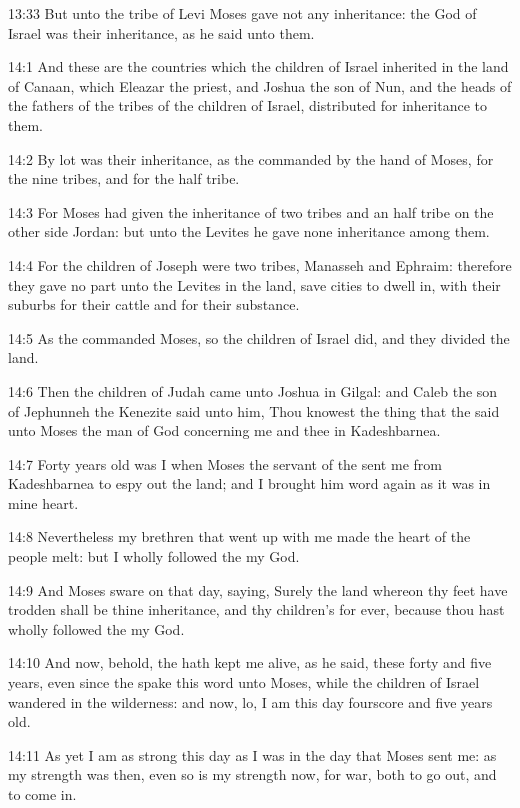 13:33 But unto the tribe of Levi Moses gave not any inheritance: the \LORD God of Israel was their inheritance, as he said unto them.

14:1 And these are the countries which the children of Israel inherited in the land of Canaan, which Eleazar the priest, and Joshua the son of Nun, and the heads of the fathers of the tribes of the children of Israel, distributed for inheritance to them.

14:2 By lot was their inheritance, as the \LORD commanded by the hand of Moses, for the nine tribes, and for the half tribe.

14:3 For Moses had given the inheritance of two tribes and an half tribe on the other side Jordan: but unto the Levites he gave none inheritance among them.

14:4 For the children of Joseph were two tribes, Manasseh and Ephraim: therefore they gave no part unto the Levites in the land, save cities to dwell in, with their suburbs for their cattle and for their substance.

14:5 As the \LORD commanded Moses, so the children of Israel did, and they divided the land.

14:6 Then the children of Judah came unto Joshua in Gilgal: and Caleb the son of Jephunneh the Kenezite said unto him, Thou knowest the thing that the \LORD said unto Moses the man of God concerning me and thee in Kadeshbarnea.

14:7 Forty years old was I when Moses the servant of the \LORD sent me from Kadeshbarnea to espy out the land; and I brought him word again as it was in mine heart.

14:8 Nevertheless my brethren that went up with me made the heart of the people melt: but I wholly followed the \LORD my God.

14:9 And Moses sware on that day, saying, Surely the land whereon thy feet have trodden shall be thine inheritance, and thy children's for ever, because thou hast wholly followed the \LORD my God.

14:10 And now, behold, the \LORD hath kept me alive, as he said, these forty and five years, even since the \LORD spake this word unto Moses, while the children of Israel wandered in the wilderness: and now, lo, I am this day fourscore and five years old.

14:11 As yet I am as strong this day as I was in the day that Moses sent me: as my strength was then, even so is my strength now, for war, both to go out, and to come in.

